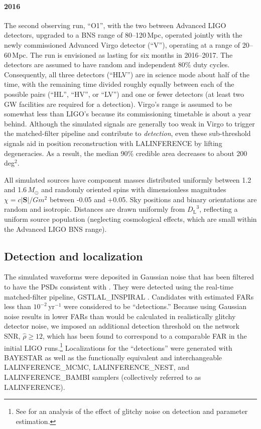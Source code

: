 \documentclass[amsmath,amssymb,aps,prx,reprint,nopreprintnumbers,nofootinbib,showpacs]{revtex4-1}
\begin{document}
\paragraph*{2016} The second observing run, ``O1'', with the two between Advanced \acs{LIGO} detectors, upgraded to a \ac{BNS} range of 80\nobreakdashes--120\,Mpc, operated jointly with the newly commissioned Advanced Virgo detector (``V''), operating at a range of 20\nobreakdashes--60\,Mpc. The run is envisioned as lasting for six months in 2016\nobreakdashes--2017. The detectors are assumed to have random and independent 80\% duty cycles. Consequently, all three detectors (``HLV'') are in science mode about half of the time, with the remaining time divided roughly equally between each of the possible pairs (``HL'', ``HV'', or ``LV'') and one or fewer detectors (at least two \ac{GW} facilities are required for a detection). Virgo's range is assumed to be somewhat less than \acs{LIGO}'s because its commissioning timetable is about a year behind. Although the simulated signals are generally too weak in Virgo to trigger the matched\nobreakdashes-filter pipeline and contribute to \emph{detection}, even these sub\nobreakdashes-threshold signals aid in position reconstruction with LALINFERENCE by lifting degeneracies. As a result, the median 90\% credible area decreases to about 200\,deg$^2$.

All simulated sources have component masses distributed uniformly between 1.2 and 1.6\,$M_\odot$ and randomly oriented spins with dimensionless magnitudes $\chi = c|\mathbf{S}|/Gm^2$ between -0.05 and +0.05. Sky positions and binary orientations are random and isotropic. Distances are drawn uniformly from ${D_\mathrm{L}}^3$, reflecting a uniform source population (neglecting cosmological effects, which are small within the Advanced \acs{LIGO} \ac{BNS} range).

\subsection{Detection and localization}

The simulated waveforms were deposited in Gaussian noise that has been filtered to have the \acp{PSD} consistent with \cite{LIGOObservingScenarios}. They were detected using the real\nobreakdashes-time matched\nobreakdashes-filter pipeline, GSTLAL\_INSPIRAL \citep{Cannon:2011vi}. Candidates with estimated \acp{FAR} less than $10^{-2}$\,yr$^{-1}$ were considered to be ``detections.'' Because using Gaussian noise results in lower \acp{FAR} than would be calculated in realistically glitchy detector noise, we imposed an additional detection threshold on the network \ac{SNR}, $\hat{\rho} \geq 12$, which has been found to correspond to a comparable \ac{FAR} in the initial \ac{LIGO} runs.\footnote{See \cite{BerryLocalization} for an analysis of the effect of glitchy noise on detection and parameter estimation.} Localizations for the ``detections'' were generated with \ac{BAYESTAR} as well as the functionally equivalent and interchangeable LALINFERENCE\_MCMC, LALINFERENCE\_NEST, and LALINFERENCE\_BAMBI samplers (collectively referred to as LALINFERENCE).
\end{document}
